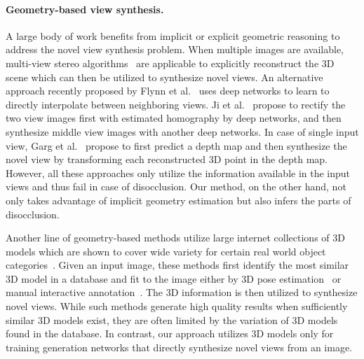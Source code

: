 \documentclass[10pt,twocolumn,letterpaper]{article}
\begin{document}

\vspace{-1mm}
\paragraph{Geometry-based view synthesis.}
A large body of work benefits from implicit or explicit geometric reasoning to address the novel view synthesis problem. When multiple images are available, multi-view stereo algorithms~\cite{furukawa_mvs} are applicable to explicitly reconstruct the 3D scene which can then be utilized to synthesize novel views. An alternative approach recently proposed by Flynn et al.~\cite{flynn2015deepstereo} uses deep networks to learn to directly interpolate between neighboring views. Ji et al.~\cite{ji_cvpr2017} propose to rectify the two view images first with estimated homography by deep networks, and then synthesize middle view images with another deep networks. In case of single input view, Garg et al.~\cite{garg_eccv2016} propose to first predict a depth map and then synthesize the novel view by transforming each reconstructed 3D point in the depth map. However, all these approaches only utilize the information available in the input views and thus fail in case of disocclusion. Our method, on the other hand, not only takes advantage of implicit geometry estimation but also infers the parts of disocclusion.

Another line of geometry-based methods utilize large internet collections of 3D models which are shown to cover wide variety for certain real world object categories~\cite{OM3D2014,rematas2016novel}. Given an input image, these methods first identify the most similar 3D model in a database and fit to the image either by 3D pose estimation~\cite{rematas2016novel} or manual interactive annotation~\cite{OM3D2014}. The 3D information is then utilized to synthesize novel views. While such methods generate high quality results when sufficiently similar 3D models exist, they are often limited by the variation of 3D models found in the database. In contrast, our approach utilizes 3D models only for training generation networks that directly synthesize novel views from an image.
\end{document}
